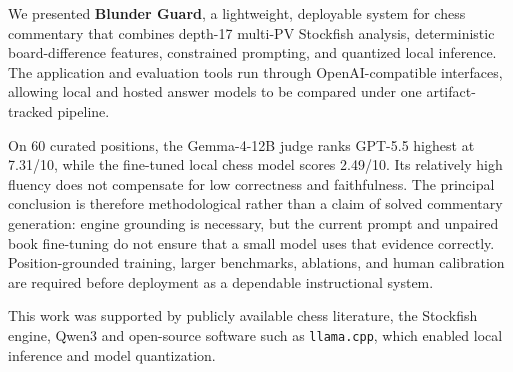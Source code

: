 \documentclass[sigconf,nonacm]{acmart}
\begin{document}
We presented \textbf{Blunder Guard}, a lightweight, deployable system for chess commentary that combines depth-17 multi-PV Stockfish analysis, deterministic board-difference features, constrained prompting, and quantized local inference. The application and evaluation tools run through OpenAI-compatible interfaces, allowing local and hosted answer models to be compared under one artifact-tracked pipeline.

On 60 curated positions, the Gemma-4-12B judge ranks GPT-5.5 highest at 7.31/10, while the fine-tuned local chess model scores 2.49/10. Its relatively high fluency does not compensate for low correctness and faithfulness. The principal conclusion is therefore methodological rather than a claim of solved commentary generation: engine grounding is necessary, but the current prompt and unpaired book fine-tuning do not ensure that a small model uses that evidence correctly. Position-grounded training, larger benchmarks, ablations, and human calibration are required before deployment as a dependable instructional system.


\begin{acks}
This work was supported by publicly available chess literature, the Stockfish engine, Qwen3 and open-source software such as \texttt{llama.cpp}, which enabled local inference and model quantization.
\end{acks}




\end{document}
